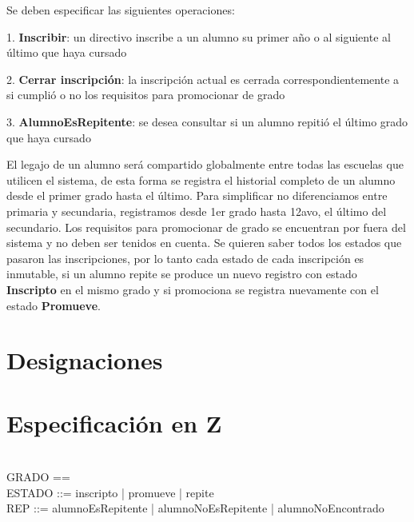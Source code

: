 \documentclass{article}
\begin{document}
Se deben especificar las siguientes operaciones:

1. \textbf{Inscribir}: un directivo inscribe a un alumno su primer año o al siguiente al último que haya cursado

2. \textbf{Cerrar inscripción}: la inscripción actual es cerrada correspondientemente a si cumplió o no los requisitos para promocionar de grado

3. \textbf{AlumnoEsRepitente}: se desea consultar si un alumno repitió el último grado que haya cursado

El legajo de un alumno será compartido globalmente entre todas las escuelas que utilicen el sistema, de esta forma se registra el historial completo de un alumno desde el primer grado hasta el último.
Para simplificar no diferenciamos entre primaria y secundaria, registramos desde 1er grado hasta 12avo, el último del secundario. Los requisitos para promocionar de grado se encuentran por fuera del sistema y no deben ser tenidos en cuenta.
Se quieren saber todos los estados que pasaron las inscripciones, por lo tanto cada estado de cada inscripción es inmutable, si un alumno repite se produce un nuevo registro con estado \textbf{Inscripto} en el mismo grado y si promociona se registra nuevamente con el estado \textbf{Promueve}.


\section*{Designaciones}

\section*{Especificación en Z}
  \begin{zed}
    [ALUMNO] \\
    GRADO == \nat \\
    ESTADO ::= inscripto | promueve | repite \\
    REP ::= alumnoEsRepitente | alumnoNoEsRepitente | alumnoNoEncontrado
  \end{zed}
  
\end{document}
